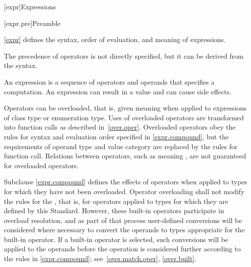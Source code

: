 [expr]{Expressions}


%
%
%
%
%
%
%

[expr.pre]{Preamble}

\pnum
{}%
\begin{note}
\ref{expr} defines the syntax, order of evaluation, and meaning
of expressions.
\begin{footnote}
The precedence of operators is not directly specified, but it can be
derived from the syntax.
\end{footnote}
An expression is a sequence of operators and operands that specifies a
computation. An expression can result in a value and can cause side
effects.
\end{note}

\pnum
{}%
\begin{note}
Operators can be overloaded, that is, given meaning when applied to
expressions of class type or enumeration
type. Uses of overloaded operators are transformed into
function calls as described in~\ref{over.oper}. Overloaded operators
obey the rules for syntax and evaluation order specified in \ref{expr.compound},
but the requirements of operand type and value category are replaced
by the rules for function call. Relations between operators, such as
 meaning , are not guaranteed for overloaded
operators.
\end{note}

\pnum
Subclause \ref{expr.compound} defines the effects of operators when applied to types
for which they have not been overloaded. Operator overloading shall not
modify the rules for the ,
that is, for operators applied to types for which they are defined by this
Standard. However, these built-in operators participate in overload
resolution, and as part of that process user-defined conversions will be
considered where necessary to convert the operands to types appropriate
for the built-in operator. If a built-in operator is selected, such
conversions will be applied to the operands before the operation is
considered further according to the rules in \ref{expr.compound};
see~\ref{over.match.oper}, \ref{over.built}.

